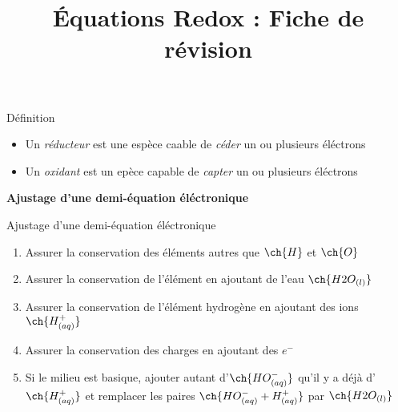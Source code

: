 \documentclass[10pt,a4paper]{article}
\begin{document}
\pagestyle{fancy}
\fancyhead{}

\title{Équations Redox : Fiche de révision}

\fancyhead[C]{\thetitle}

\begin{mainbox}{Définition}
    \begin{itemize}
        \item Un \textit{réducteur} est une espèce caable de \textit{céder} un ou plusieurs éléctrons
        \item Un \textit{oxidant} est un epèce capable de \textit{capter} un ou plusieurs éléctrons 
    \end{itemize}
\end{mainbox}

\begin{center}{\large \bf Ajustage d'une demi-équation éléctronique}\end{center}

\begin{subbox}{Ajustage d'une demi-équation éléctronique}
    \begin{enumerate}
        \item Assurer la conservation des éléments autres que $\ch{H}$ et  $\ch{O}$
        \item Assurer la conservation de l'élément en ajoutant de l'eau $\ch{H2O_{(l)}}$
        \item Assurer la conservation de l'élément hydrogène en ajoutant des ions $\ch{H^+_{(aq)}}$
        \item Assurer la conservation des charges en ajoutant des $e^-$
        \item Si le milieu est basique, ajouter autant d'$\ch{HO^-_{(aq)}}$ qu'il y a déjà d'$\ch{H^+_{(aq)}}$ et remplacer les paires $\ch{HO^-_{(aq)} + H^+_{(aq)}}$ par $\ch{H2O_{(l)}}$
    \end{enumerate}    
\end{subbox}
\end{document}
